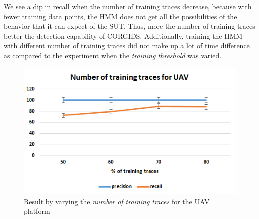 \begin{itemize}
We see a dip in recall when the number of training traces decrease, because with fewer training data points, the HMM does not get all the possibilities of the behavior that it can expect of the SUT. Thus, more the number of training traces better the detection capability of CORGIDS. Additionally, training the HMM with different number of training traces did not make up a lot of time difference as compared to the experiment when the \textit{training threshold} was varied.

\begin{figure}[ht]
    \centering
    \includegraphics[scale=0.65,keepaspectratio = true]{Graphics/UAV_traces.png}
    \caption{Result by varying the \textit{number of training traces} for the UAV platform}
    \label{fig:UAV_traces}
\end{figure}

\end{itemize}

